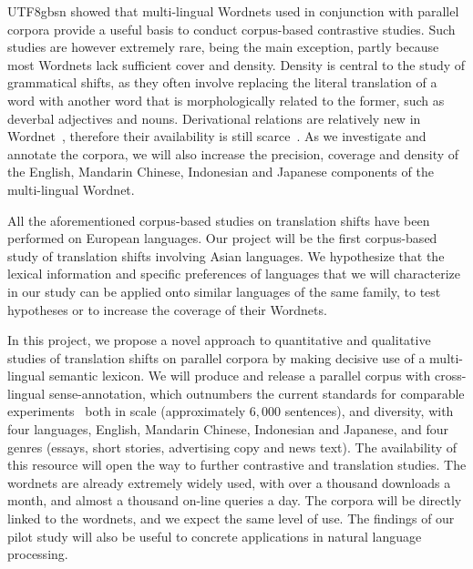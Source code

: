 \documentclass[12pt]{book} %
\begin{document}
\begin{CJK}{UTF8}{gbsn}
\citet{peters2002cross} showed that multi-lingual Wordnets used in
conjunction with parallel corpora provide a useful basis to conduct
corpus-based contrastive studies.  Such studies are however extremely
rare, \citet{bentivogli2005exploiting} being the main exception,
partly because most Wordnets lack sufficient cover and density.
Density is central to the study of grammatical shifts, as they often
involve replacing the literal translation of a word with another word
that is morphologically related to the former, such as deverbal
adjectives and nouns.  Derivational relations are relatively new in
Wordnet~\citep{fellbaum2003morphosemantic}, therefore their
availability is still scarce~\citep{pala2007derivational,
  fellbaum2009putting, piasecki2010toward, gabor2012boosting}.  As we
investigate and annotate the corpora, we will also increase the
precision, coverage and density of the English, Mandarin Chinese,
Indonesian and Japanese components of the multi-lingual Wordnet.

All the aforementioned corpus-based studies on translation shifts have
been performed on European languages.  Our project will be the first
corpus-based study of translation shifts involving Asian languages.
We hypothesize that the lexical information and specific preferences
of languages that we will characterize in our study can be applied
onto similar languages of the same family, to test hypotheses or to
increase the coverage of their Wordnets.


In this project, we propose a novel approach to quantitative and
qualitative studies of translation shifts on parallel corpora by
making decisive use of a multi-lingual semantic lexicon.  We will
produce and release a parallel corpus with cross-lingual
sense-annotation, which outnumbers the current standards for
comparable experiments~\citep{Pado:Erk:2010} both in scale
(approximately $6,000$ sentences), and diversity, with four languages,
English, Mandarin Chinese, Indonesian and Japanese, and four genres
(essays, short stories, advertising copy and news text).  The
availability of this resource will open the way to further contrastive
and translation studies.  The wordnets are already extremely widely
used, with over a thousand downloads a month, and almost a thousand
on-line queries a day.  The corpora will be directly linked to the
wordnets, and we expect the same level of use.  The findings of our
pilot study will also be useful to concrete applications in natural
language processing.


\end{CJK}
\end{document}
